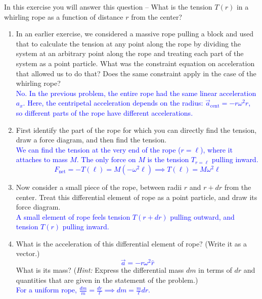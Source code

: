 \documentclass[11pt, letterpaper, openany]{book}
\newenvironment{exercise}[1][Exercise]{%
  \tcolorbox[blanker, breakable, left=1em,
    before skip=1em, after skip=1em,
    borderline west={3pt}{0pt}{PhysNavy},
    colback=PhysCream,
    before upper={\textcolor{PhysNavy}{\sffamily\bfseries #1:}\space}
  ]%
}{%
  \endtcolorbox%
}
\begin{document}
\begin{exercise}[Exercise 1]
In this exercise you will answer this question -- What is the tension $T(r)$ in a whirling rope as a function of distance $r$ from the center?
\begin{enumerate}[label=(\alph*)]
    \item In an earlier exercise, we considered a massive rope pulling a block and used that to calculate the tension at any point along the rope by dividing the system at an arbitrary point along the rope and treating each part of the system as a point particle. What was the constraint equation on acceleration that allowed us to do that? Does the same constraint apply in the case of the whirling rope? \\
    \textcolor{blue}{No. In the previous problem, the entire rope had the same linear acceleration $a_x$. Here, the centripetal acceleration depends on the radius: $\vec{a}_{\text{cent}} = -r\omega^2\hat{r}$, so different parts of the rope have different accelerations.}
    
    \item First identify the part of the rope for which you can directly find the tension, draw a force diagram, and then find the tension. \\
    \textcolor{blue}{We can find the tension at the very end of the rope ($r = \ell$), where it attaches to mass $M$.
    The only force on $M$ is the tension $T_{r=\ell}$ pulling inward.
    \[ F_{\text{net}} = -T(\ell) = M(-\omega^2\ell) \implies T(\ell) = M\omega^2\ell \]
    }
    
    \item Now consider a small piece of the rope, between radii $r$ and $r+dr$ from the center. Treat this differential element of rope as a point particle, and draw its force diagram. \\
    \textcolor{blue}{A small element of rope feels tension $T(r+dr)$ pulling outward, and tension $T(r)$ pulling inward.}
    \begin{center}
    \end{center}
    
    \item What is the acceleration of this differential element of rope? (Write it as a vector.) \\
    \textcolor{blue}{\[ \vec{a} = -r\omega^2\hat{r} \]}
    What is its mass? (\textit{Hint:} Express the differential mass $dm$ in terms of $dr$ and quantities that are given in the statement of the problem.) \\
    \textcolor{blue}{For a uniform rope, $\frac{dm}{m} = \frac{dr}{\ell} \implies dm = \frac{m}{\ell}dr$.}
    

\end{enumerate}
\end{exercise}
\end{document}
